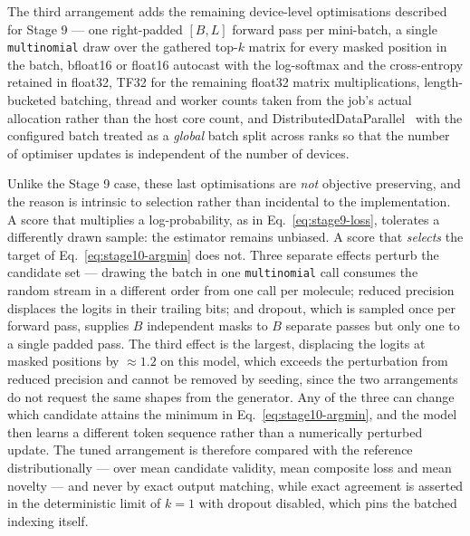 The third arrangement adds the remaining device-level optimisations described
for Stage 9 --- one right-padded $[B,L]$ forward pass per mini-batch, a single
\texttt{multinomial} draw over the gathered top-$k$ matrix for every masked
position in the batch, bfloat16 or float16 autocast with the log-softmax and
the cross-entropy retained in float32, TF32 for the remaining float32 matrix
multiplications, length-bucketed batching, thread and worker counts taken from
the job's actual allocation rather than the host core count, and
DistributedDataParallel~\cite{li2020pytorchddp} with the configured batch
treated as a \emph{global} batch split across ranks so that the number of
optimiser updates is independent of the number of devices.

Unlike the Stage 9 case, these last optimisations are \emph{not} objective
preserving, and the reason is intrinsic to selection rather than incidental to
the implementation. A score that multiplies a log-probability, as in
Eq.~\eqref{eq:stage9-loss}, tolerates a differently drawn sample: the estimator
remains unbiased. A score that \emph{selects} the target of
Eq.~\eqref{eq:stage10-argmin} does not. Three separate effects perturb the
candidate set --- drawing the batch in one \texttt{multinomial} call consumes
the random stream in a different order from one call per molecule; reduced
precision displaces the logits in their trailing bits; and dropout, which is
sampled once per forward pass, supplies $B$ independent masks to $B$ separate
passes but only one to a single padded pass. The third effect is the largest,
displacing the logits at masked positions by $\approx\!1.2$ on this model,
which exceeds the perturbation from reduced precision and cannot be removed by
seeding, since the two arrangements do not request the same shapes from the
generator. Any of the three can change which candidate attains the minimum in
Eq.~\eqref{eq:stage10-argmin}, and the model then learns a different token
sequence rather than a numerically perturbed update. The tuned arrangement is
therefore compared with the reference distributionally --- over mean candidate
validity, mean composite loss and mean novelty --- and never by exact output
matching, while exact agreement is asserted in the deterministic limit of
$k=1$ with dropout disabled, which pins the batched indexing itself.

